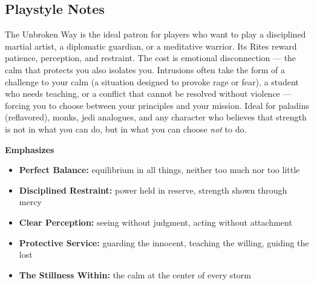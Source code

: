 \subsection*{Playstyle Notes}
The Unbroken Way is the ideal patron for players who want to play a disciplined martial artist, a diplomatic guardian, or a meditative warrior. Its Rites reward patience, perception, and restraint. The cost is emotional disconnection --- the calm that protects you also isolates you. Intrusions often take the form of a challenge to your calm (a situation designed to provoke rage or fear), a student who needs teaching, or a conflict that cannot be resolved without violence --- forcing you to choose between your principles and your mission. Ideal for paladins (reflavored), monks, jedi analogues, and any character who believes that strength is not in what you can do, but in what you can choose \textit{not} to do.

\noindent\textbf{Emphasizes}
\begin{itemize}
  \item \textbf{Perfect Balance:} equilibrium in all things, neither too much nor too little
  \item \textbf{Disciplined Restraint:} power held in reserve, strength shown through mercy
  \item \textbf{Clear Perception:} seeing without judgment, acting without attachment
  \item \textbf{Protective Service:} guarding the innocent, teaching the willing, guiding the lost
  \item \textbf{The Stillness Within:} the calm at the center of every storm
\end{itemize}

